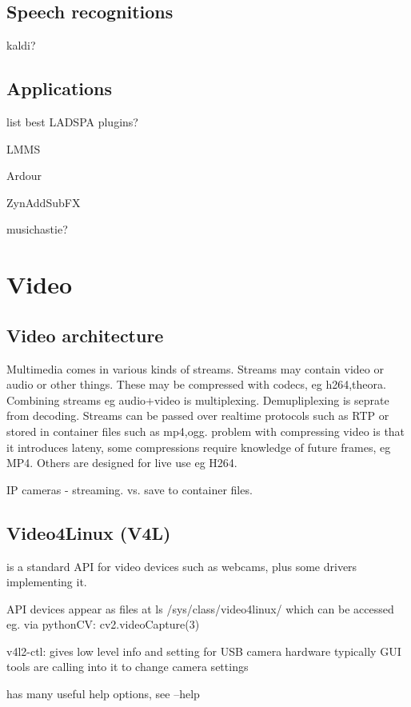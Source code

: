 \documentclass[oneside,english]{scrbook}
\begin{document}
\chapter{Speech recognitions}

kaldi?


\chapter{Applications}

list best LADSPA plugins?

LMMS

Ardour

ZynAddSubFX

musichastie?


\part{Video}


\chapter{Video architecture}

Multimedia comes in various kinds of streams. Streams may contain
video or audio or other things. These may be compressed with codecs,
eg h264,theora. Combining streams eg audio+video is multiplexing.
Demupliplexing is seprate from decoding. Streams can be passed over
realtime protocols such as RTP or stored in container files such as
mp4,ogg. problem with compressing video is that it introduces lateny,
some compressions require knowledge of future frames, eg MP4. Others
are designed for live use eg H264. 

IP cameras - streaming.  vs. save to container files.

\chapter{Video4Linux (V4L)}

is a standard API for video devices such as webcams, plus some drivers
implementing it.

API devices appear as files at ls /sys/class/video4linux/ which can
be accessed eg. via pythonCV: cv2.videoCapture(3) 

v4l2-ctl: gives low level info and setting for USB camera hardware
typically GUI tools are calling into it to change camera settings

has many useful help options, see --help 
\end{document}
